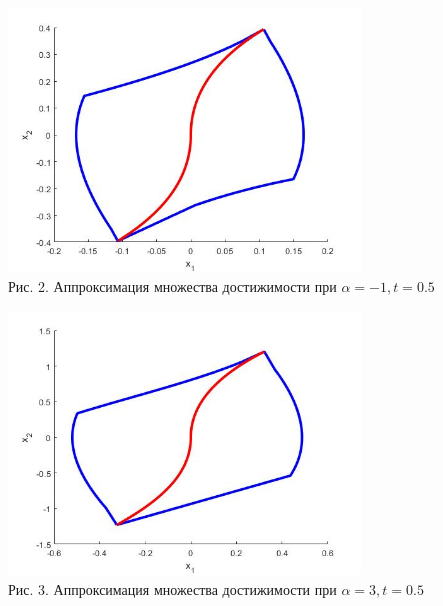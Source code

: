 \documentclass{article}
\theoremstyle{definition}
\begin{document}
	\begin{center}
		\includegraphics[width=0.7\textwidth]{example2.jpg}\\
		{Рис. 2. Аппроксимация множества достижимости при $\alpha = -1, t = 0.5$ }
	\end{center}

	\begin{center}
		\includegraphics[width=0.7\textwidth]{example3.jpg}\\
		{Рис. 3. Аппроксимация множества достижимости при $\alpha = 3, t = 0.5$ }
	\end{center}
\end{document}
